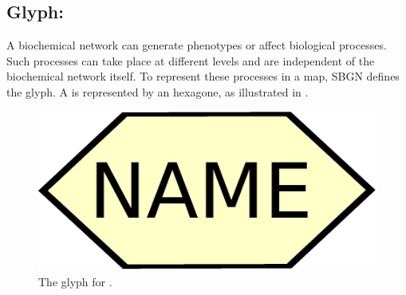 
\subsection{Glyph: }
\label{sec:phenotype}

A biochemical network can generate phenotypes or affect biological
processes.  Such processes can take place at different levels and are
independent of the biochemical network itself.  To represent these
processes in a map, SBGN defines the  glyph. A  is represented by an hexagone, as illustrated in . 

\begin{figure}[H]
  \centering
  \includegraphics[scale = 0.3]{images/phenotype}
  \caption{The \PD glyph for .}
  \label{fig:phenotype}
\end{figure}

